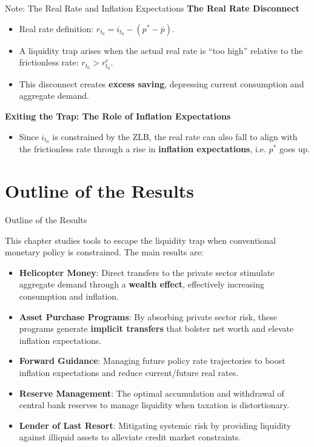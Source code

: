 \documentclass[11pt,aspectratio=169]{beamer}
\begin{document}
\begin{frame}{Note: The Real Rate and Inflation Expectations}
\small
\textbf{The Real Rate Disconnect}
\begin{itemize}
    \item Real rate definition: $r_{t_{0}} = i_{t_{0}} - (p^{\ast} - \bar{p})$.
    \item A liquidity trap arises when the actual real rate is \enquote{too high} relative to the frictionless rate: $r_{t_0} > r_{t_0}^e$.
    \item This disconnect creates \textbf{excess saving}, depressing current consumption and aggregate demand.
\end{itemize}

\vspace{0.4cm}
\textbf{Exiting the Trap: The Role of Inflation Expectations}
\begin{itemize}
    \item Since $i_{t_0}$ is constrained by the ZLB, the real rate can also fall to align with the frictionless rate through a rise in \textbf{inflation expectations}, i.e. $p^{\ast}$ goes up.
\end{itemize}
\end{frame}

\section{Outline of the Results}
\begin{frame}{Outline of the Results}
\small

This chapter studies tools to escape the liquidity trap when conventional monetary policy is constrained. The main results are:

\begin{itemize}
    \item \textbf{Helicopter Money}: Direct transfers to the private sector stimulate aggregate demand through a \textbf{wealth effect}, effectively increasing consumption and inflation.
    \item \textbf{Asset Purchase Programs}: By absorbing private sector risk, these programs generate \textbf{implicit transfers} that bolster net worth and elevate inflation expectations.
    \item \textbf{Forward Guidance}: Managing future policy rate trajectories to boost inflation expectations and reduce current/future real rates.
    \item \textbf{Reserve Management}: The optimal accumulation and withdrawal of central bank  reserves to manage liquidity when taxation is distortionary.
    \item \textbf{Lender of Last Resort}: Mitigating systemic risk by providing liquidity against illiquid assets to alleviate credit market constraints.
\end{itemize}

\end{frame}
\end{document}
